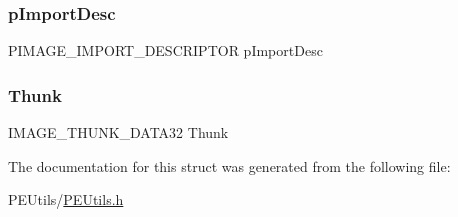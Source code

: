 \subsubsection{\texorpdfstring{p\+Import\+Desc}{pImportDesc}}
{\footnotesize\ttfamily P\+I\+M\+A\+G\+E\+\_\+\+I\+M\+P\+O\+R\+T\+\_\+\+D\+E\+S\+C\+R\+I\+P\+T\+OR p\+Import\+Desc}

\mbox{\label{struct___i_m_p_o_r_t___e_n_t_r_y_adf2d5b2f75038d17949bd2aa1d3b3406}} 
\subsubsection{\texorpdfstring{Thunk}{Thunk}}
{\footnotesize\ttfamily I\+M\+A\+G\+E\+\_\+\+T\+H\+U\+N\+K\+\_\+\+D\+A\+T\+A32 Thunk}



The documentation for this struct was generated from the following file\+:\begin{DoxyCompactItemize}
\item 
P\+E\+Utils/\mbox{\hyperlink{_p_e_utils_8h}{P\+E\+Utils.\+h}}\end{DoxyCompactItemize}
